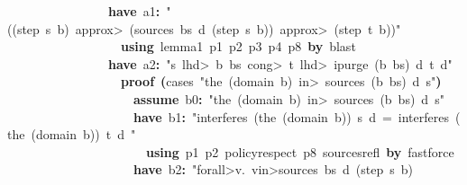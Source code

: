 \documentclass{article}
\newcommand{\syntaxKEYWORDA}[1]{\textcolor[rgb]{0.0,0.4,0.6}{\textbf{#1}}}
\newcommand{\syntaxKEYWORDC}[1]{\textcolor[rgb]{0.0,0.6,1.0}{\textbf{#1}}}
\newcommand{\syntaxLITERALA}[1]{\textcolor[rgb]{1.0,0.0,0.8}{#1}}
\newcommand{\syntaxOPERATOR}[1]{\textcolor[rgb]{0.0,0.0,0.0}{\textbf{#1}}}
\newcommand{\syntaxKEYWORDA}[1]{\textcolor[rgb]{0.0,0.4,0.6}{\textbf{#1}}}
\newcommand{\syntaxKEYWORDC}[1]{\textcolor[rgb]{0.0,0.6,1.0}{\textbf{#1}}}
\newcommand{\syntaxLITERALA}[1]{\textcolor[rgb]{1.0,0.0,0.8}{#1}}
\newcommand{\syntaxOPERATOR}[1]{\textcolor[rgb]{0.0,0.0,0.0}{\textbf{#1}}}
\newcommand{\syntaxKEYWORDA}[1]{\textcolor[rgb]{0.0,0.4,0.6}{\textbf{#1}}}
\newcommand{\syntaxKEYWORDC}[1]{\textcolor[rgb]{0.0,0.6,1.0}{\textbf{#1}}}
\newcommand{\syntaxLITERALA}[1]{\textcolor[rgb]{1.0,0.0,0.8}{#1}}
\newcommand{\syntaxOPERATOR}[1]{\textcolor[rgb]{0.0,0.0,0.0}{\textbf{#1}}}
\newcommand{\syntaxKEYWORDA}[1]{\textcolor[rgb]{0.0,0.4,0.6}{#1}}
\newcommand{\syntaxKEYWORDC}[1]{\textcolor[rgb]{0.0,0.6,1.0}{#1}}
\newcommand{\syntaxLITERALA}[1]{\textcolor[rgb]{1.0,0.0,0.8}{\textbf{#1}}}
\newcommand{\syntaxOPERATOR}[1]{\textcolor[rgb]{0.0,0.0,0.0}{#1}}
\newcommand{\syntaxKEYWORDA}[1]{\textcolor[rgb]{0.0,0.4,0.6}{\textbf{#1}}}
\newcommand{\syntaxKEYWORDC}[1]{\textcolor[rgb]{0.0,0.6,1.0}{\textbf{#1}}}
\newcommand{\syntaxLITERALA}[1]{\textcolor[rgb]{1.0,0.0,0.8}{#1}}
\newcommand{\syntaxOPERATOR}[1]{\textcolor[rgb]{0.0,0.0,0.0}{\textbf{#1}}}
\newcommand{\syntaxKEYWORDA}[1]{\textcolor[rgb]{0.0,0.4,0.6}{\textbf{#1}}}
\newcommand{\syntaxKEYWORDC}[1]{\textcolor[rgb]{0.0,0.6,1.0}{\textbf{#1}}}
\newcommand{\syntaxLITERALA}[1]{\textcolor[rgb]{1.0,0.0,0.8}{#1}}
\newcommand{\syntaxOPERATOR}[1]{\textcolor[rgb]{0.0,0.0,0.0}{\textbf{#1}}}
\begin{document}
{\ }{\ }{\ }{\ }{\ }{\ }{\ }{\ }{\ }{\ }{\ }{\ }{\ }{\ }{\ }{\ }\syntaxKEYWORDA{have}{\ }a1\syntaxOPERATOR{:}{\ }\syntaxLITERALA{"((step{\ }s{\ }b){\ }\<approx>{\ }(sources{\ }bs{\ }d{\ }(step{\ }s{\ }b)){\ }\<approx>{\ }(step{\ }t{\ }b))"}\hspace*{\fill}\\
{\ }{\ }{\ }{\ }{\ }{\ }{\ }{\ }{\ }{\ }{\ }{\ }{\ }{\ }{\ }{\ }{\ }{\ }\syntaxKEYWORDA{using}{\ }lemma\usebox{\underscorebox}1{\ }p1{\ }p2{\ }p3{\ }p4{\ }p8{\ }\syntaxKEYWORDA{by}{\ }blast\hspace*{\fill}\\
{\ }{\ }{\ }{\ }{\ }{\ }{\ }{\ }{\ }{\ }{\ }{\ }{\ }{\ }{\ }{\ }\syntaxKEYWORDA{have}{\ }a2\syntaxOPERATOR{:}{\ }\syntaxLITERALA{"s{\ }\<lhd>{\ }b{\ }\usebox{\hashbox}{\ }bs{\ }\<cong>{\ }t{\ }\<lhd>{\ }ipurge{\ }(b{\ }\usebox{\hashbox}{\ }bs){\ }d{\ }t{\ }\usebox{\atbox}{\ }d"}\hspace*{\fill}\\
{\ }{\ }{\ }{\ }{\ }{\ }{\ }{\ }{\ }{\ }{\ }{\ }{\ }{\ }{\ }{\ }{\ }{\ }\syntaxKEYWORDA{proof}{\ }\syntaxOPERATOR{(}cases{\ }\syntaxLITERALA{"the{\ }(domain{\ }b){\ }\<in>{\ }sources{\ }(b{\ }\usebox{\hashbox}{\ }bs){\ }d{\ }s"}\syntaxOPERATOR{)}\hspace*{\fill}\\
{\ }{\ }{\ }{\ }{\ }{\ }{\ }{\ }{\ }{\ }{\ }{\ }{\ }{\ }{\ }{\ }{\ }{\ }{\ }{\ }\syntaxKEYWORDC{assume}{\ }b0\syntaxOPERATOR{:}{\ }\syntaxLITERALA{"the{\ }(domain{\ }b){\ }\<in>{\ }sources{\ }(b{\ }\usebox{\hashbox}{\ }bs){\ }d{\ }s"}\hspace*{\fill}\\
{\ }{\ }{\ }{\ }{\ }{\ }{\ }{\ }{\ }{\ }{\ }{\ }{\ }{\ }{\ }{\ }{\ }{\ }{\ }{\ }\syntaxKEYWORDA{have}{\ }b1\syntaxOPERATOR{:}{\ }\syntaxLITERALA{"interferes{\ }(the{\ }(domain{\ }b)){\ }s{\ }d{\ }={\ }interferes{\ }(the{\ }(domain{\ }b)){\ }t{\ }d{\ }"}\hspace*{\fill}\\
{\ }{\ }{\ }{\ }{\ }{\ }{\ }{\ }{\ }{\ }{\ }{\ }{\ }{\ }{\ }{\ }{\ }{\ }{\ }{\ }{\ }{\ }\syntaxKEYWORDA{using}{\ }p1{\ }p2{\ }policy\usebox{\underscorebox}respect{\ }p8{\ }sources\usebox{\underscorebox}refl{\ }\syntaxKEYWORDA{by}{\ }fastforce\hspace*{\fill}\\
{\ }{\ }{\ }{\ }{\ }{\ }{\ }{\ }{\ }{\ }{\ }{\ }{\ }{\ }{\ }{\ }{\ }{\ }{\ }{\ }\syntaxKEYWORDA{have}{\ }b2\syntaxOPERATOR{:}{\ }\syntaxLITERALA{"\<forall>v.{\ }v\<in>sources{\ }bs{\ }d{\ }(step{\ }s{\ }b){\ }}\hspace*{\fill}\\
\end{document}
